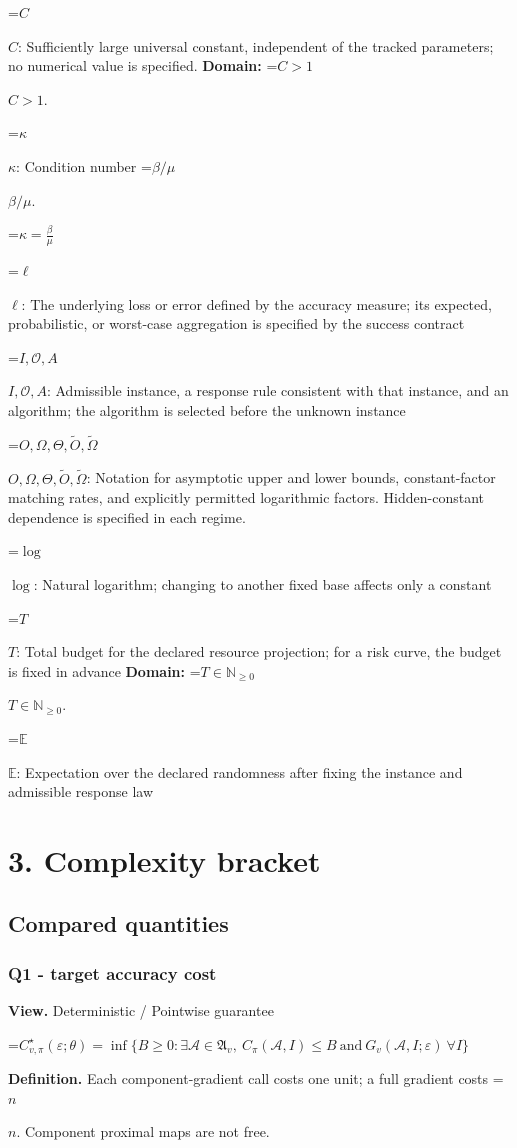 \documentclass[10pt,a4paper]{article}
\newcommand{\AtlasMath}[1]{\par\begingroup\centering\setbox0=\hbox{$\displaystyle #1$}\ifdim\wd0>1.4\linewidth\typeout{ATLAS WIDE FORMULA: \the\wd0}\fi\ifdim\wd0>\linewidth\resizebox{\linewidth}{!}{\box0}\else\box0\fi\par\endgroup}
\newcommand{\AtlasInlineMath}[1]{\begingroup\setbox0=\hbox{$#1$}\ifdim\wd0>.4\linewidth\endgroup\AtlasMath{#1}\else\endgroup$#1$\fi}
\begin{document}
\AtlasInlineMath{C}: Sufficiently large universal constant, independent of the tracked parameters; no numerical value is specified. \textbf{Domain:} \AtlasInlineMath{C>1}.

\AtlasInlineMath{\kappa}: Condition number \AtlasInlineMath{\beta/\mu}.


\AtlasMath{\kappa=\frac{\beta}{\mu}}


\AtlasInlineMath{\ell}: The underlying loss or error defined by the accuracy measure; its expected, probabilistic, or worst-case aggregation is specified by the success contract

\AtlasInlineMath{I,\mathcal{O},A}: Admissible instance, a response rule consistent with that instance, and an algorithm; the algorithm is selected before the unknown instance

\AtlasInlineMath{O,\Omega,\Theta,\widetilde{O},\widetilde\Omega}: Notation for asymptotic upper and lower bounds, constant-factor matching rates, and explicitly permitted logarithmic factors. Hidden-constant dependence is specified in each regime.

\AtlasInlineMath{\log}: Natural logarithm; changing to another fixed base affects only a constant

\AtlasInlineMath{T}: Total budget for the declared resource projection; for a risk curve, the budget is fixed in advance \textbf{Domain:} \AtlasInlineMath{T\in\mathbb{N}_{\ge0}}.

\AtlasInlineMath{\mathbb{E}}: Expectation over the declared randomness after fixing the instance and admissible response law

\section{3. Complexity bracket}
\subsection{Compared quantities}
\subsubsection{Q1 - target accuracy cost}
\textbf{View.} Deterministic / Pointwise guarantee

\AtlasMath{C^\star_{v,\pi}(\varepsilon;\theta)=\inf\{B\ge0:\exists\mathcal A\in\mathfrak A_v,\ C_\pi(\mathcal A,I)\le B\ \text{and}\ G_v(\mathcal A,I;\varepsilon)\ \forall I\}}
\textbf{Definition.} Each component-gradient call costs one unit; a full gradient costs \AtlasInlineMath{n}. Component proximal maps are not free.
\end{document}
